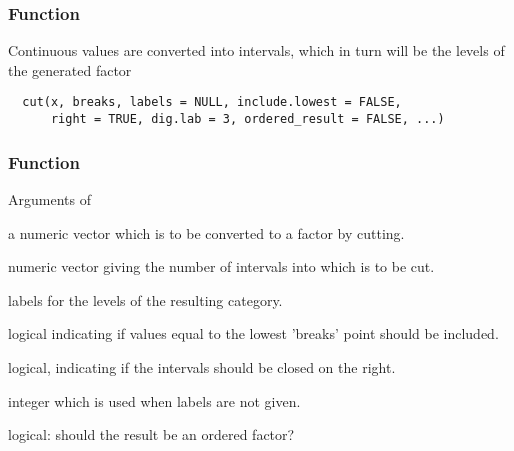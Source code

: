 \documentclass[12pt]{beamer}\usepackage[]{graphicx}\usepackage[]{color}
\begin{document}

\begin{frame}[fragile]
\frametitle{Function }

Continuous values are converted into intervals, which in turn will be the levels of the generated factor

\begin{verbatim}
  cut(x, breaks, labels = NULL, include.lowest = FALSE,
      right = TRUE, dig.lab = 3, ordered_result = FALSE, ...)
\end{verbatim}

\end{frame}


\begin{frame}
\frametitle{Function }

Arguments of 
\bi
 \item {} a numeric vector which is to be converted to a factor by cutting.
 \item {} numeric vector giving the number of intervals into which  is to be cut.
 \item {} labels for the levels of the resulting category.
 \item {} logical indicating if values equal to the lowest 'breaks' point should be included.
 \item {} logical, indicating if the intervals should be closed on the right.
 \item {} integer which is used when labels are not given.
 \item {} logical: should the result be an ordered factor?
\ei

\end{frame}

\end{document}

